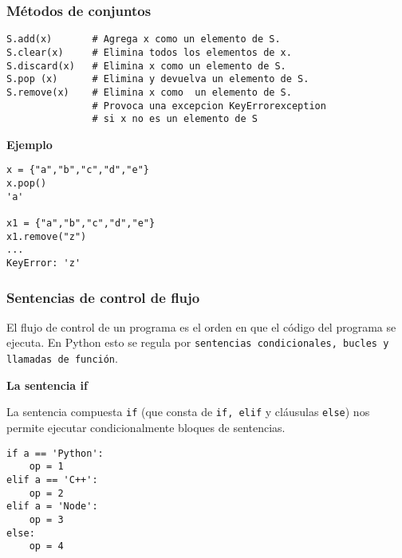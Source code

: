\documentclass[10pt]{beamer}
\begin{document}
\begin{frame}[fragile]
\frametitle {M\'etodos de conjuntos}

\vspace{0.2cm}

\begin{lstlisting}
S.add(x)       # Agrega x como un elemento de S.
S.clear(x)     # Elimina todos los elementos de x.
S.discard(x)   # Elimina x como un elemento de S.
S.pop (x)      # Elimina y devuelva un elemento de S.
S.remove(x)    # Elimina x como  un elemento de S. 
               # Provoca una excepcion KeyErrorexception
               # si x no es un elemento de S
\end{lstlisting}

\vspace{0.2cm}

\textbf{Ejemplo}

\vspace{0.2cm}

\begin{lstlisting}
x = {"a","b","c","d","e"}
x.pop()
'a'

x1 = {"a","b","c","d","e"}
x1.remove("z")
...
KeyError: 'z'
\end{lstlisting}

\end{frame}
\begin{frame}[fragile]
\frametitle{Sentencias de control de flujo}

El flujo de control de un programa es el orden en que el c\'odigo del programa se ejecuta. En Python esto se regula por \texttt{sentencias condicionales, bucles y llamadas de funci\'on}.

\vspace{0.2cm}
 
\textbf{La sentencia if}

\vspace{0.2cm}

La sentencia  compuesta \texttt{if} (que consta de \texttt{if, elif} y cl\'ausulas \texttt{else}) nos permite ejecutar condicionalmente bloques de sentencias. 

\vspace{0.2cm}

\begin{lstlisting}
if a == 'Python':
    op = 1
elif a == 'C++':
    op = 2
elif a = 'Node':
    op = 3
else:
    op = 4
\end{lstlisting}
\end{frame}
\end{document}
